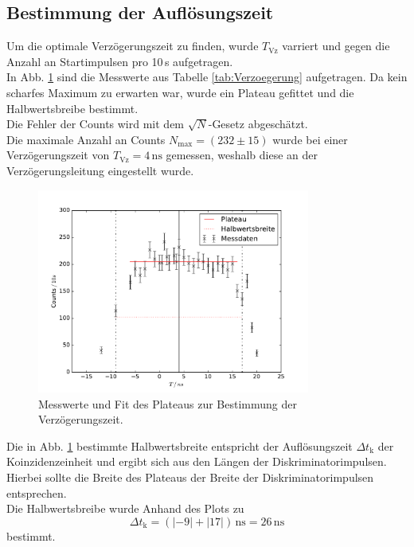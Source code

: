 \subsection{Bestimmung der Auflösungszeit}
Um die optimale Verzögerungszeit zu finden, wurde  $T_\text{Vz}$ varriert und gegen die Anzahl an Startimpulsen pro 10\,s aufgetragen.\\
In Abb. \ref{fig:Verzoegerung} sind die Messwerte aus Tabelle \ref{tab:Verzoegerung} aufgetragen. Da kein scharfes Maximum zu erwarten war,
wurde ein Plateau gefittet und die Halbwertsbreibe bestimmt.\\
Die Fehler der Counts wird mit dem $\sqrt{N}$-Gesetz abgeschätzt.\\
Die maximale Anzahl an Counts $N_{\text{max}}=(232\pm15)$ wurde bei einer Verzögerungszeit von $T_\text{Vz}=4\,\text{ns}$ gemessen, weshalb diese
an der Verzögerungsleitung eingestellt wurde.
\begin{figure}
  \centering
  \includegraphics[width=0.8\textwidth]{plots/plotVerzoegerung.pdf}
  \caption{Messwerte und Fit des Plateaus zur Bestimmung der Verzögerungszeit.}
  \label{fig:Verzoegerung}
\end{figure}
Die in Abb. \ref{fig:Verzoegerung} bestimmte Halbwertsbreite entspricht der Auflösungszeit $\Delta t_{\text{k}}$
der Koinzidenzeinheit und ergibt sich aus den Längen der Diskriminatorimpulsen.
Hierbei sollte die Breite des Plateaus der Breite der Diskriminatorimpulsen entsprechen.\\
Die Halbwertsbreibe wurde Anhand
des Plots zu
\begin{equation*}
  \Delta t_{\text{k}}=(|-9|+|17|)\,\text{ns}=26\,\text{ns}
\end{equation*}
bestimmt.
